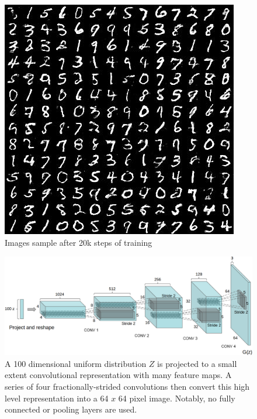\begin{figure}[ht]
\begin{center}
\includegraphics[width=\columnwidth]{figures/sample_0100}
\caption{\label{sample100} Images sample after 20k steps of training}
\end{center}
\vspace{-0.45cm}
\end{figure}


\begin{figure}
\begin{center}
\includegraphics[width=\textwidth]{figures/networkArc}
\caption{\label{networkArc} A 100 dimensional uniform distribution $Z$ is projected to a small extent convolutional representation with many feature maps. A series of four fractionally-strided convolutions then convert this high level representation into a 64 $x$ 64 pixel image. Notably, no fully connected or pooling layers are used.}
\end{center}
\vspace{-0.45cm}
\end{figure}



